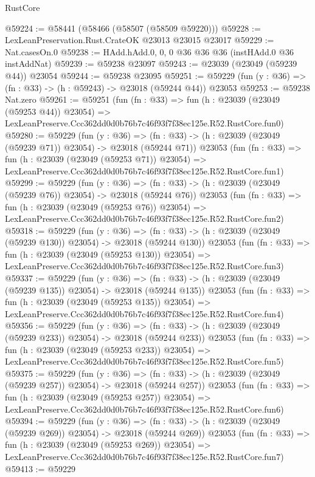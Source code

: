 \begin{lexlean}{RustCore}
\begin{coremodule}
@59224 := @58441 (@58466 (@58507 (@58509 @59220)))
@59228 := LexLeanPreservation.Rust.CrateOK @23013 @23015 @23017
@59229 := Nat.casesOn.{0}
@59238 := HAdd.hAdd.{0, 0, 0} @36 @36 @36 (instHAdd.{0} @36 instAddNat)
@59239 := @59238 @23097
@59243 := @23039 (@23049 (@59239 @44)) @23054
@59244 := @59238 @23095
@59251 := @59229 (fun (y : @36) => (fn : @33) -> (h : @59243) -> @23018 (@59244 @44)) @23053
@59253 := @59238 Nat.zero
@59261 := @59251
    (fun (fn : @33) =>
    fun (h : @23039 (@23049 (@59253 @44)) @23054) =>
    LexLeanPreserve.Ccc362dd0d0b76b7c46f93f7f38ec125e.R52.RustCore.fun0)
@59280 := @59229
    (fun (y : @36) =>
    (fn : @33) -> (h : @23039 (@23049 (@59239 @71)) @23054) -> @23018 (@59244 @71))
    @23053
    (fun (fn : @33) =>
    fun (h : @23039 (@23049 (@59253 @71)) @23054) =>
    LexLeanPreserve.Ccc362dd0d0b76b7c46f93f7f38ec125e.R52.RustCore.fun1)
@59299 := @59229
    (fun (y : @36) =>
    (fn : @33) -> (h : @23039 (@23049 (@59239 @76)) @23054) -> @23018 (@59244 @76))
    @23053
    (fun (fn : @33) =>
    fun (h : @23039 (@23049 (@59253 @76)) @23054) =>
    LexLeanPreserve.Ccc362dd0d0b76b7c46f93f7f38ec125e.R52.RustCore.fun2)
@59318 := @59229
    (fun (y : @36) =>
    (fn : @33) -> (h : @23039 (@23049 (@59239 @130)) @23054) -> @23018 (@59244 @130))
    @23053
    (fun (fn : @33) =>
    fun (h : @23039 (@23049 (@59253 @130)) @23054) =>
    LexLeanPreserve.Ccc362dd0d0b76b7c46f93f7f38ec125e.R52.RustCore.fun3)
@59337 := @59229
    (fun (y : @36) =>
    (fn : @33) -> (h : @23039 (@23049 (@59239 @135)) @23054) -> @23018 (@59244 @135))
    @23053
    (fun (fn : @33) =>
    fun (h : @23039 (@23049 (@59253 @135)) @23054) =>
    LexLeanPreserve.Ccc362dd0d0b76b7c46f93f7f38ec125e.R52.RustCore.fun4)
@59356 := @59229
    (fun (y : @36) =>
    (fn : @33) -> (h : @23039 (@23049 (@59239 @233)) @23054) -> @23018 (@59244 @233))
    @23053
    (fun (fn : @33) =>
    fun (h : @23039 (@23049 (@59253 @233)) @23054) =>
    LexLeanPreserve.Ccc362dd0d0b76b7c46f93f7f38ec125e.R52.RustCore.fun5)
@59375 := @59229
    (fun (y : @36) =>
    (fn : @33) -> (h : @23039 (@23049 (@59239 @257)) @23054) -> @23018 (@59244 @257))
    @23053
    (fun (fn : @33) =>
    fun (h : @23039 (@23049 (@59253 @257)) @23054) =>
    LexLeanPreserve.Ccc362dd0d0b76b7c46f93f7f38ec125e.R52.RustCore.fun6)
@59394 := @59229
    (fun (y : @36) =>
    (fn : @33) -> (h : @23039 (@23049 (@59239 @269)) @23054) -> @23018 (@59244 @269))
    @23053
    (fun (fn : @33) =>
    fun (h : @23039 (@23049 (@59253 @269)) @23054) =>
    LexLeanPreserve.Ccc362dd0d0b76b7c46f93f7f38ec125e.R52.RustCore.fun7)
@59413 := @59229

\end{coremodule}
\end{lexlean}
